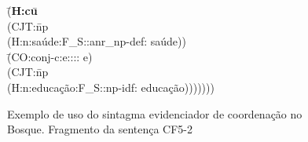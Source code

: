 \begin{figure}[!h]
    \centering
    \begin{minipage}{10cm}
        \begin{tabbing}
            \=(\textbf{H:cu}\=\+ \\
            \>    (CJT:\=np \+\\
            \>        (H:n:saúde:F\_S::anr\_np-def: saúde))\-\\
            \>    \=(CO:conj-c:e:::: e)\\
            \>    (CJT:\=np \+\\
            \>        (H:n:educação:F\_S::np-idf: educação)))))))
        \end{tabbing}
    \end{minipage}
    \caption[Exemplo de uso do sintagma evidenciador de coordenação no Bosque]{Exemplo de uso do sintagma evidenciador de coordenação no Bosque. Fragmento da sentença CF5-2}
    \label{fig:bosque_exemplo_cu}
\end{figure}